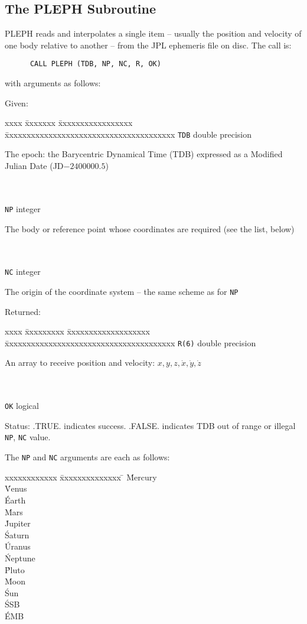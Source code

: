 \subsection{The PLEPH Subroutine}
PLEPH reads and interpolates a single item --
usually the position and velocity
of one body relative to another --
from the JPL ephemeris file on disc.
The call is:
\begin{verbatim}
      CALL PLEPH (TDB, NP, NC, R, OK)
\end{verbatim}
with arguments as follows:

Given:
\begin{tabbing}
xxxx \= xxxxxxx \= xxxxxxxxxxxxxxxxx \=
xxxxxxxxxxxxxxxxxxxxxxxxxxxxxxxxxxxxxxx \kill
\> \verb|TDB| \> double precision \>
             \parbox[t]{24em}{The epoch:  the Barycentric
                              Dynamical Time
                              (TDB) expressed as a
                              Modified Julian Date (JD$-2400000.5$)} \\ \\
\> \verb|NP| \> integer \>
             \parbox[t]{24em}{The body or reference point whose
                              coordinates are required
                              (see the list, below)} \\ \\
\> \verb|NC| \> integer \>
             \parbox[t]{24em}{The origin of the coordinate system -- the
                              same scheme as for \verb|NP|}
\end{tabbing}
Returned:
\begin{tabbing}
xxxx \= xxxxxxxxx \= xxxxxxxxxxxxxxxxxxx \=
xxxxxxxxxxxxxxxxxxxxxxxxxxxxxxxxxxxxxxx \kill
\> \verb|R(6)| \> double precision \>
              \parbox[t]{24em}{An array to receive position and
                               velocity:
                               $x, y, z, \dot{x}, \dot{y}, \dot{z}$} \\ \\
\> \verb|OK| \> logical \>
              \parbox[t]{24em}{Status:  .TRUE. indicates success.
                               .FALSE. indicates TDB out of range or illegal
                               \verb|NP|, \verb|NC| value.}
\end{tabbing}
The \verb|NP| and \verb|NC| arguments are each as follows:
\begin{tabbing}
xxxxxxxxxxxx \= xxxxxxxxxxxxxx \= \kill
{} \' Mercury  \\
 \' Venus    \\
 \' Earth    \\
 \' Mars     \\
 \' Jupiter  \\
 \' Saturn   \\
 \' Uranus   \\
 \' Neptune  \\
 \' Pluto    \\
 \' Moon     \\
 \' Sun      \\
 \' SSB      \\
 \' EMB
\end{tabbing}
